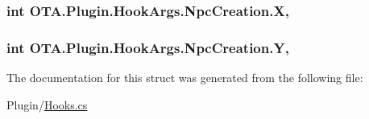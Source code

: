 \subsubsection[{X}]{\setlength{\rightskip}{0pt plus 5cm}int O\+T\+A.\+Plugin.\+Hook\+Args.\+Npc\+Creation.\+X\hspace{0.3cm}{\ttfamily [get]}, {\ttfamily [set]}}\label{struct_o_t_a_1_1_plugin_1_1_hook_args_1_1_npc_creation_a7b068d20547471d864bea46f89b63e70}
\hypertarget{struct_o_t_a_1_1_plugin_1_1_hook_args_1_1_npc_creation_a8fe80f76a990c03c5954003578bd4462}{}
\subsubsection[{Y}]{\setlength{\rightskip}{0pt plus 5cm}int O\+T\+A.\+Plugin.\+Hook\+Args.\+Npc\+Creation.\+Y\hspace{0.3cm}{\ttfamily [get]}, {\ttfamily [set]}}\label{struct_o_t_a_1_1_plugin_1_1_hook_args_1_1_npc_creation_a8fe80f76a990c03c5954003578bd4462}


The documentation for this struct was generated from the following file\+:\begin{DoxyCompactItemize}
\item 
Plugin/\hyperlink{_hooks_8cs}{Hooks.\+cs}\end{DoxyCompactItemize}
